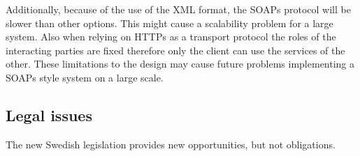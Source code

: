 \documentclass[14pt]{article}
\begin{document}
Additionally, because of the use of the \gls{XML} format, the \glspl{SOAP} protocol will be slower than other options. This might cause a scalability problem for a large system. Also when relying on \glspl{HTTP} as a transport protocol the roles of the interacting parties are fixed therefore only the client can use the services of the other. These limitations to the design may cause future problems implementing a \glspl{SOAP} style system on a large scale.



\subsection{Legal issues}

The new Swedish legislation provides new opportunities, but not obligations. \cite{RiR19}
\end{document}
